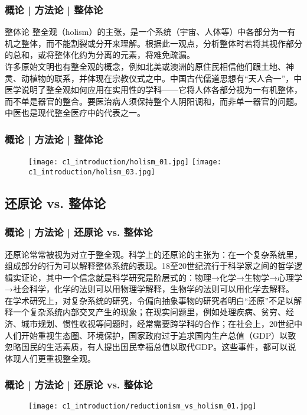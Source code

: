 \begin{frame}
  \frametitle{概论 | 方法论 | 整体论}
  \begin{block}{整体论}
整全观（holism）的主张，是一个系统（宇宙、人体等）中各部分为一有机之整体，而不能割裂或分开来理解。根据此一观点，分析整体时若将其视作部分的总和，或将整体化约为分离的元素，将难免疏漏。\\
\vspace{1em}
许多原始文明也有整全观的概念，例如北美或澳洲的原住民相信他们跟土地、神灵、动植物的联系，并体现在宗教仪式之中。中国古代儒道思想有“天人合一”，中医学说明了整全观如何应用在实用性的学科——它将人体各部分视为一有机整体，而不单是器官的整合。要医治病人须保持整个人阴阳调和，而非单一器官的问题。中医也是现代整全医疗中的代表之一。
  \end{block}
\end{frame}

\begin{frame}
  \frametitle{概论 | 方法论 | 整体论}
  \begin{figure}
    \centering
    \texttt{[image: c1\_introduction/holism\_01.jpg]}\quad
    \texttt{[image: c1\_introduction/holism\_03.jpg]}
  \end{figure}
\end{frame}

\subsection{还原论 vs. 整体论}
\begin{frame}
  \frametitle{概论 | 方法论 | 还原论 vs. 整体论}
还原论常常被视为对立于整全观。科学上的还原论的主张为：在一个复杂系统里，组成部分的行为可以解释整体系统的表现。18至20世纪流行于科学家之间的哲学逻辑实证论，其中一个信念就是科学研究是阶层式的：物理→化学→生物学→心理学→社会科学，化学的法则可以用物理学解释，生物学的法则可以用化学去解释。\\
\vspace{1em}
在学术研究上，对复杂系统的研究，令偏向抽象事物的研究者明白“还原”不足以解释一个复杂系统内部交叉产生的现象；在现实问题里，例如处理疾病、贫穷、经济、城市规划、惯性收视等问题时，经常需要跨学科的合作；在社会上，20世纪中人们开始重视生态圈、环境保护，国家政府过于追求国内生产总值（GDP）以致忽略国民的生活素质，有人提出国民幸福总值以取代GDP。这些事件，都可以说体现人们更重视整全观。
\end{frame}

\begin{frame}
  \frametitle{概论 | 方法论 | 还原论 vs. 整体论}
  \begin{figure}
    \centering
    \texttt{[image: c1\_introduction/reductionism\_vs\_holism\_01.jpg]}
  \end{figure}
\end{frame}

